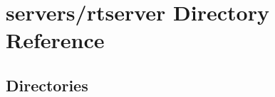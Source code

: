 \section{servers/rtserver Directory Reference}
\label{dir_3f7e093977acd93407a8cc9d2c1d7f5b}
\subsection*{Directories}
\begin{DoxyCompactItemize}
\end{DoxyCompactItemize}
